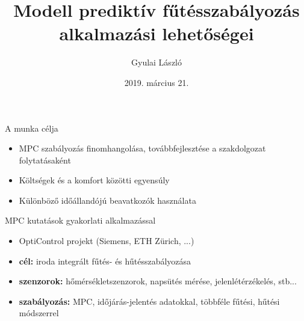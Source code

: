 \documentclass[14pt,handout]{beamer}
\title{Modell prediktív fűtésszabályozás alkalmazási lehetőségei}
\author{Gyulai László}
\date{2019. március 21.}
\begin{document}
	
	\frame{\titlepage}
%
%        	        	
%

\begin{frame}{A munka célja}
\begin{itemize}
	\setlength{\itemsep}{6pt}
	\item MPC szabályozás finomhangolása, továbbfejlesztése a szakdolgozat folytatásaként
	\item Költségek és a komfort közötti egyensúly	
	\item Különböző időállandójú beavatkozók használata
\end{itemize}
\end{frame}


\begin{frame}{MPC kutatások gyakorlati alkalmazással}
\begin{itemize}
	\setlength{\itemsep}{6pt}
	\item OptiControl projekt (Siemens, ETH Zürich, ...)
	\item \textbf{cél: }iroda integrált fűtés- és hűtésszabályozása
	\item \textbf{szenzorok: }hőmérsékletszenzorok, napsütés mérése, jelenlétérzékelés, stb...
	\item \textbf{szabályozás: } MPC, időjárás-jelentés adatokkal, többféle fűtési, hűtési módszerrel	

\end{itemize}
\end{frame}
\end{document}
